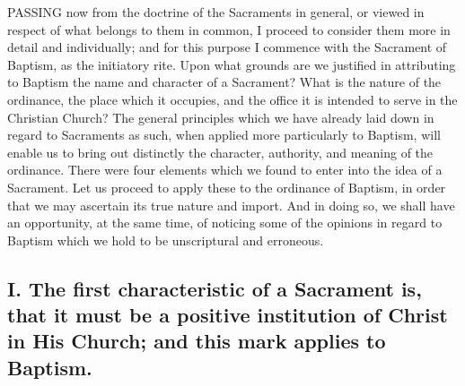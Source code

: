 \documentclass[]{book}
\begin{document}
PASSING now from the doctrine of the Sacraments in general, or viewed in respect of what belongs to them in common, I proceed to consider them more in detail and individually; and for this purpose I commence with the Sacrament of Baptism, as the initiatory rite. Upon what grounds are we justified in attributing to Baptism the name and character of a Sacrament? What is the nature of the ordinance, the place which it occupies, and the office it is intended to serve in the Christian Church? The general principles which we have already laid down in regard to Sacraments as such, when applied more particularly to Baptism, will enable us to bring out distinctly the character, authority, and meaning of the ordinance. There were four elements which we found to enter into the idea of a Sacrament. Let us proceed to apply these to the ordinance of Baptism, in order that we may ascertain its true nature and import. And in doing so, we shall have an opportunity, at the same time, of noticing some of the opinions in regard to Baptism which we hold to be unscriptural and erroneous.

\hypertarget{i.-the-first-characteristic-of-a-sacrament-is-that-it-must-be-a-positive-institution-of-christ-in-his-church-and-this-mark-applies-to-baptism.}{%
\subsection{I. The first characteristic of a Sacrament is, that it must be a positive institution of Christ in His Church; and this mark applies to Baptism.}\label{i.-the-first-characteristic-of-a-sacrament-is-that-it-must-be-a-positive-institution-of-christ-in-his-church-and-this-mark-applies-to-baptism.}}
\end{document}
